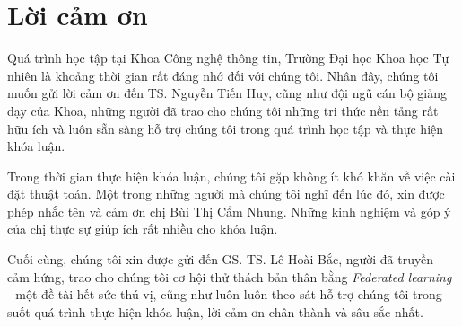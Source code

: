 \chapter*{Lời cảm ơn}
\label{thanks}


Quá trình học tập tại Khoa Công nghệ thông tin, Trường Đại học Khoa học Tự nhiên là khoảng thời gian rất đáng nhớ đối với chúng tôi. Nhân đây, chúng tôi muốn gửi lời cảm ơn đến TS. Nguyễn Tiến Huy, cũng như đội ngũ cán bộ giảng dạy của Khoa, những người đã trao cho chúng tôi những tri thức nền tảng rất hữu ích và luôn sẵn sàng hỗ trợ chúng tôi trong quá trình học tập và thực hiện khóa luận.

Trong thời gian thực hiện khóa luận, chúng tôi gặp không ít khó khăn về việc cài đặt thuật toán. Một trong những người mà chúng tôi nghĩ đến lúc đó, xin được phép nhắc tên và cảm ơn chị Bùi Thị Cẩm Nhung. Những kinh nghiệm và góp ý của chị thực sự giúp ích rất nhiều cho khóa luận.

Cuối cùng, chúng tôi xin được gửi đến GS. TS. Lê Hoài Bắc, người đã truyền cảm hứng, trao cho chúng tôi cơ hội thử thách bản thân bằng \textit{Federated learning} - một đề tài hết sức thú vị, cũng như luôn luôn theo sát hỗ trợ chúng tôi trong suốt quá trình thực hiện khóa luận, lời cảm ơn chân thành và sâu sắc nhất.




